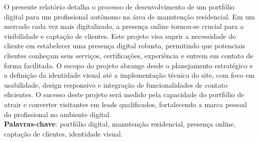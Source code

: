 \begin{thesisresumo}
O presente relatório detalha o processo de desenvolvimento de um portfólio digital para um profissional autônomo na área de manutenção residencial. Em um mercado cada vez mais digitalizado, a presença online tornou-se crucial para a visibilidade e captação de clientes. Este projeto visa suprir a necessidade do cliente em estabelecer uma presença digital robusta, permitindo que potenciais clientes conheçam seus serviços, certificações, experiência e entrem em contato de forma facilitada. O escopo do projeto abrange desde o planejamento estratégico e a definição da identidade visual até a implementação técnica do site, com foco em usabilidade, design responsivo e integração de funcionalidades de contato eficientes. O sucesso deste projeto será medido pela capacidade do portfólio de atrair e converter visitantes em leads qualificados, fortalecendo a marca pessoal do profissional no ambiente digital.
\ \\


\textbf{Palavras-chave}: portfólio digital, manutenção residencial, presença online, captação de clientes, identidade visual.

\end{thesisresumo}
